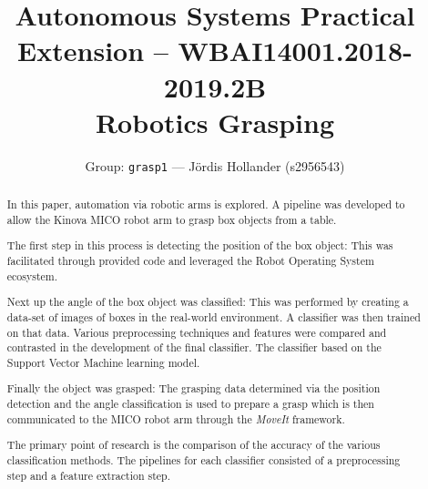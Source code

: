 \documentclass[letterpaper, 10 pt, conference]{conf/ieeeconf}  %
\title{\LARGE \bf
  Autonomous Systems Practical Extension -- WBAI14001.2018-2019.2B \\
  Robotics Grasping
}
\author{Group: \texttt{grasp1} --- J\"{o}rdis Hollander (s2956543)}
\begin{document}
\maketitle
\thispagestyle{empty}
\pagestyle{empty}


\begin{abstract}
  
  In this paper, automation via robotic arms is explored. A pipeline was developed
  to allow the Kinova MICO robot arm to grasp box objects from a table.
  
  The first step in this process is detecting the position of the box object: This was facilitated through
  provided code and leveraged the Robot Operating System ecosystem.
  
  Next up the angle of the box object was classified: This was performed by
    creating a data-set of images of boxes in the real-world environment. A
    classifier was then trained on that data. Various preprocessing techniques and
    features were compared and contrasted in the development of the final
    classifier.  The classifier based on the Support Vector Machine learning
    model.
    
  Finally the object was grasped: The grasping data determined via the position
    detection and the angle classification is used to prepare a grasp which is then
    communicated to the MICO robot arm through the \textit{MoveIt} framework.
  

  The primary point of research is the comparison of the accuracy of the various
  classification methods. The pipelines for each classifier consisted of a
  preprocessing step and a feature extraction step. \\
  



\end{abstract}
\end{document}
